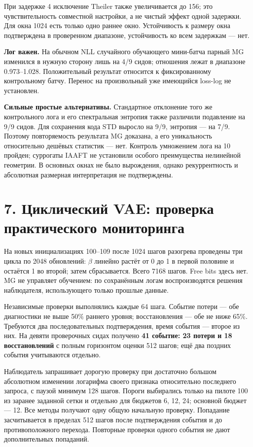 \documentclass[10pt,a4paper]{article}
\begin{document}
При задержке 4 исключение Theiler также увеличивается до 156; это чувствительность совместной настройки, а не чистый эффект одной задержки. Для окна 1024 есть только одно раннее окно. Устойчивость к размеру окна подтверждена в проверенном диапазоне, устойчивость ко всем задержкам --- нет.

\textbf{Лог важен.} На обычном NLL случайного обучающего мини-батча парный MG изменился в нужную сторону лишь на 4/9 сидов; отношения лежат в диапазоне 0.973--1.028. Положительный результат относится к фиксированному контрольному батчу. Перенос на произвольный уже имеющийся loss-log не установлен.

\textbf{Сильные простые альтернативы.} Стандартное отклонение того же контрольного лога и его спектральная энтропия также различили подавление на 9/9 сидов. Для сохранения кода STD выросло на 9/9, энтропия --- на 7/9. Поэтому повторяемость результата MG доказана, а его уникальность относительно дешёвых статистик --- нет. Контроль умножением лога на 10 пройден; суррогаты IAAFT не установили особого преимущества нелинейной геометрии. В основных окнах не было вырождения, однако рекуррентность и абсолютная размерная интерпретация не подтверждены.

\section*{7. Циклический VAE: проверка практического мониторинга}

На новых инициализациях 100--109 после 1024 шагов разогрева проведены три цикла по 2048 обновлений: $\beta$ линейно растёт от 0 до 1 в первой половине и остаётся 1 во второй; затем сбрасывается. Всего 7168 шагов. Free bits здесь нет. MG не управляет обучением: по сохранённым логам воспроизводятся решения наблюдателя, использующего только прошлые данные.

Независимые проверки выполнялись каждые 64 шага. Событие потери --- обе диагностики не выше 50\% раннего уровня; восстановления --- обе не ниже 65\%. Требуются два последовательных подтверждения, время события --- второе из них. На девяти проверочных сидах получено \textbf{41 событие: 23 потери и 18 восстановлений} с полным горизонтом оценки 512 шагов; ещё два поздних события учитываются отдельно.

Наблюдатель запрашивает дорогую проверку при достаточно большом абсолютном изменении логарифма своего признака относительно последнего запроса, с паузой минимум 128 шагов. Пороги выбирались только на пилоте 100 из заранее заданной сетки и отдельно для бюджетов 6, 12, 24; основной бюджет --- 12. Все методы получают одну общую начальную проверку. Попадание засчитывается в пределах 512 шагов после подтверждения события и до противоположного перехода. Повторные проверки одного события не дают дополнительных попаданий.
\end{document}
